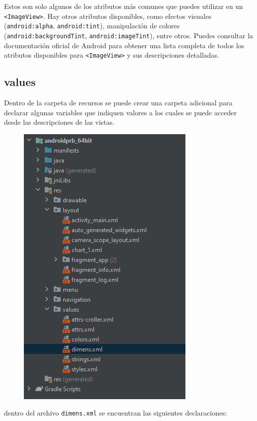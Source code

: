 Estos son solo algunos de los atributos más comunes que puedes utilizar en un \texttt{<ImageView>}. Hay otros atributos disponibles, como efectos visuales (\texttt{android:alpha}, \texttt{android:tint}), manipulación de colores (\texttt{android:backgroundTint}, \texttt{android:imageTint}), entre otros. Puedes consultar la documentación oficial de Android para obtener una lista completa de todos los atributos disponibles para \texttt{<ImageView>} y sus descripciones detalladas.



\subsection{values}

Dentro de la carpeta de recursos se puede crear una carpeta adicional para declarar algunas variables que indiquen valores a los cuales se puede acceder desde las descripciones de las vistas.

\begin{figure}[H]
    \centering
    \includegraphics[scale=0.5]{android_apps/android_f1.png}
\end{figure}

dentro del archivo \texttt{dimens.xml} se encuentran las siguientes declaraciones: \newpage

